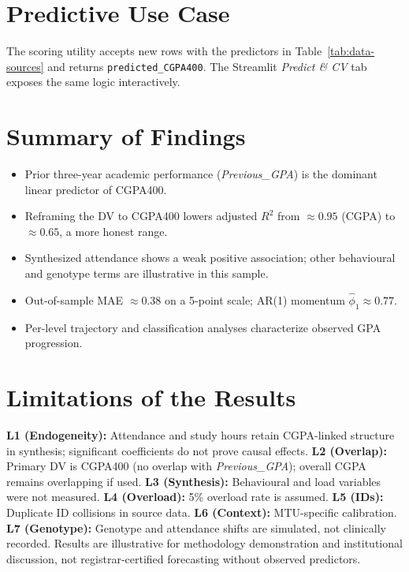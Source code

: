 \documentclass[12pt]{report}
\begin{document}
	\section{Predictive Use Case}
	The scoring utility accepts new rows with the predictors in Table~\ref{tab:data-sources} and returns \texttt{predicted\_CGPA400}. The Streamlit \textit{Predict \& CV} tab exposes the same logic interactively.
	
	\section{Summary of Findings}
	\begin{itemize}
		\item Prior three-year academic performance (\textit{Previous\_GPA}) is the dominant linear predictor of CGPA400.
		\item Reframing the DV to CGPA400 lowers adjusted $R^2$ from $\approx 0.95$ (CGPA) to $\approx 0.65$, a more honest range.
		\item Synthesized attendance shows a weak positive association; other behavioural and genotype terms are illustrative in this sample.
		\item Out-of-sample MAE $\approx 0.38$ on a 5-point scale; AR(1) momentum $\hat{\phi}_1 \approx 0.77$.
		\item Per-level trajectory and classification analyses characterize observed GPA progression.
	\end{itemize}
	
	\section{Limitations of the Results}
	\label{sec:limitations-results}
	\textbf{L1 (Endogeneity):} Attendance and study hours retain CGPA-linked structure in synthesis; significant coefficients do not prove causal effects. \textbf{L2 (Overlap):} Primary DV is CGPA400 (no overlap with \textit{Previous\_GPA}); overall CGPA remains overlapping if used. \textbf{L3 (Synthesis):} Behavioural and load variables were not measured. \textbf{L4 (Overload):} 5\% overload rate is assumed. \textbf{L5 (IDs):} Duplicate ID collisions in source data. \textbf{L6 (Context):} MTU-specific calibration. \textbf{L7 (Genotype):} Genotype and attendance shifts are simulated, not clinically recorded. Results are illustrative for methodology demonstration and institutional discussion, not registrar-certified forecasting without observed predictors.
	
\end{document}
